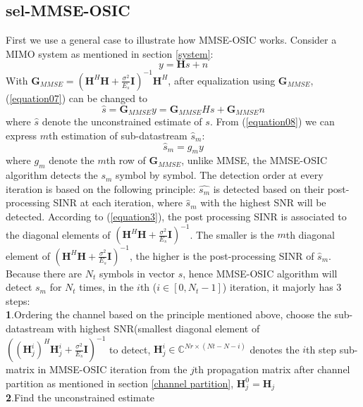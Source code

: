 \documentclass[12pt,a4paper,final]{article}
\begin{document}
\begin{spacing}{2.5}
\subsection{sel-MMSE-OSIC}
First we use a general case to illustrate how MMSE-OSIC works. Consider a MIMO system as mentioned in section \ref{system}:
\begin{equation}
y=\mathbf{H}s+n\label{equation07}
\end{equation}
With $\mathbf{G}_{MMSE}=(\mathbf{H}^{H}\mathbf{H}+\frac{\sigma^{2}}{E_{s}}\mathbf{I})^{-1}\mathbf{H}^{H}$, after equalization using $\mathbf{G}_{MMSE}$,  (\ref{equation07}) can be changed to 
\begin{equation}
\hat{s}=\mathbf{G}_{MMSE}y=\mathbf{G}_{MMSE}Hs+\mathbf{G}_{MMSE}n\label{equation08}
\end{equation}
where $\hat{s}$ denote the unconstrained estimate of $s$. From (\ref{equation08}) we can express $m$th estimation of sub-datastream $\hat{s}_{m}$:
\begin{equation}
\hat{s}_{m}={g_{m}}y\label{equation09}
\end{equation}
where $g_{m}$ denote the $m$th row of $\mathbf{G}_{MMSE}$, unlike MMSE, the MMSE-OSIC algorithm detects the $s_{m}$ symbol by symbol. The detection order at every iteration is based on the following principle: $\hat{s_{m}}$ is detected based on their post-processing SINR at each iteration, where $\hat{s}_{m}$ with the highest SNR will be detected. According to (\ref{equation3}), the post processing SINR is associated to the diagonal elements of $(\mathbf{H}^{H}\mathbf{H}+\frac{\sigma^{2}}{E_{s}}\mathbf{I})^{-1}$. The smaller is the $m$th diagonal element of $(\mathbf{H}^{H}\mathbf{H}+\frac{\sigma^{2}}{E_{s}}\mathbf{I})^{-1}$, the higher is the post-processing SINR of $\hat{s}_{m}$. Because there are $N_{t}$ symbols in vector $s$, hence MMSE-OSIC algorithm will detect $s_{m}$ for $N_{t}$ times, in the $i$th ($i\in [0,N_{t}-1]$) iteration, it majorly has 3 steps:\\
\textbf{1}.Ordering the channel based on the principle mentioned above, choose the sub-datastream with highest SNR(smallest diagonal element of $((\mathbf{H}_{j}^{i})^{H}\mathbf{H}_{j}^{i}+\frac{\sigma^{2}}{E_{s}}\mathbf{I})^{-1}$ to detect, $\mathbf{H}_{j}^{i}\in \mathbb{C}^{Nr\times (Nt-N-i)}$ denotes the $i$th step sub-matrix in MMSE-OSIC iteration from the $j$th propagation matrix after channel partition as mentioned in section \ref{channel partition}, $\mathbf{H}_{j}^{0}=\mathbf{H}_{j}$\\ 
\textbf{2}.Find the unconstrained estimate

\end{spacing}
\end{document}
